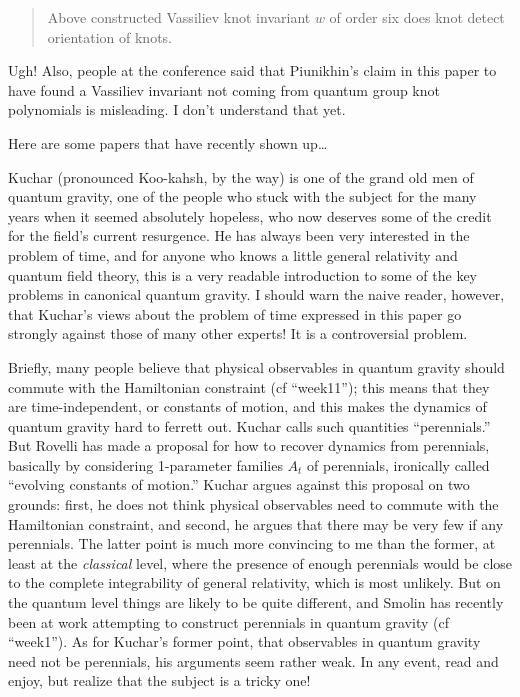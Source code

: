 \documentclass{article}
\def\tightlist{}
\renewcommand{\texttt}[1]{%
  \begingroup
  \ttfamily
  \begingroup\lccode`~=`/\lowercase{\endgroup\def~}{/\discretionary{}{}{}}%
  \begingroup\lccode`~=`[\lowercase{\endgroup\def~}{[\discretionary{}{}{}}%
  \begingroup\lccode`~=`.\lowercase{\endgroup\def~}{.\discretionary{}{}{}}%
  \catcode`/=\active\catcode`[=\active\catcode`.=\active
  \scantokens{#1\noexpand}%
  \endgroup
}
\begin{document}
\begin{quote}
Above constructed Vassiliev knot invariant \(w\) of order six does knot
detect orientation of knots.
\end{quote}

Ugh! Also, people at the conference said that Piunikhin's claim in this
paper to have found a Vassiliev invariant not coming from quantum group
knot polynomials is misleading. I don't understand that yet.

Here are some papers that have recently shown up\ldots{}


Kuchar (pronounced Koo-kahsh, by the way) is one of the grand old men of
quantum gravity, one of the people who stuck with the subject for the
many years when it seemed absolutely hopeless, who now deserves some of
the credit for the field's current resurgence. He has always been very
interested in the problem of time, and for anyone who knows a little
general relativity and quantum field theory, this is a very readable
introduction to some of the key problems in canonical quantum gravity. I
should warn the naive reader, however, that Kuchar's views about the
problem of time expressed in this paper go strongly against those of
many other experts! It is a controversial problem.

Briefly, many people believe that physical observables in quantum
gravity should commute with the Hamiltonian constraint (cf ``week11'');
this means that they are time-independent, or constants of motion, and
this makes the dynamics of quantum gravity hard to ferrett out. Kuchar
calls such quantities ``perennials.'' But Rovelli has made a proposal
for how to recover dynamics from perennials, basically by considering
1-parameter families \(A_t\) of perennials, ironically called ``evolving
constants of motion.'' Kuchar argues against this proposal on two
grounds: first, he does not think physical observables need to commute
with the Hamiltonian constraint, and second, he argues that there may be
very few if any perennials. The latter point is much more convincing to
me than the former, at least at the \emph{classical} level, where the
presence of enough perennials would be close to the complete
integrability of general relativity, which is most unlikely. But on the
quantum level things are likely to be quite different, and Smolin has
recently been at work attempting to construct perennials in quantum
gravity (cf ``week1''). As for Kuchar's former point, that observables
in quantum gravity need not be perennials, his arguments seem rather
weak. In any event, read and enjoy, but realize that the subject is a
tricky one!
\end{document}
